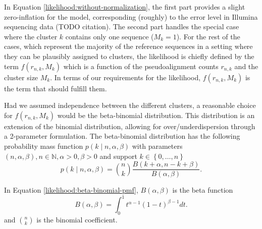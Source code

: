 \documentclass[officiallayout]{tktla}
\begin{document}
In Equation \ref{likelihood:without-normalization}, the first part provides a slight
zero-inflation for the model, corresponding (roughly) to the error
level in Illumina sequencing data (TODO citation). The second part
handles the special case where the cluster $k$ contains only one
sequence ($M_{k} = 1$). For the rest of the cases, which represent the
majority of the reference sequences in a setting where they can be
plausibly assigned to clusters, the likelihood is chiefly defined by
the term $f\left(r_{n, k}, M_{k}\right)$ which is a function of the
pseudoalignment counts $r_{n, k}$ and the cluster size $M_{k}$. In
terms of our requirements for the likelihood, $f\left(r_{n, k},
M_{k}\right)$ is the term that should fulfill them.

Had we assumed independence between the different clusters, a
reasonable choice for $f\left(r_{n, k}, M_{k}\right)$ would be the
beta-binomial distribution. This distribution is an extension of the
binomial distribution, allowing for over/underdispersion through a
2-parameter formulation. The beta-binomial distribution has the
following probability mass function $p\left(k \middle | n, \alpha,
\beta\right)$ with parameters $\left(n, \alpha, \beta\right), n \in
\mathbb{N}, \alpha > 0, \beta > 0$ and support $k \in \left\{0, \dots,
n\right\}$
\begin{equation}
  \label{likelihood:beta-binomial-pmf}
  p\left(k \middle| n, \alpha, \beta\right) = \binom{n}{k}\frac{B\left(k + \alpha, n - k + \beta\right)}{B\left(\alpha, \beta\right)}.
\end{equation}

In Equation \ref{likelihood:beta-binomial-pmf}, $B\left(\alpha, \beta\right)$ is the beta function
\begin{equation}
  \label{likelihood:beta-function}
  B\left(\alpha, \beta\right) = \int_{0}^{1}t^{\alpha - 1}\left(1 - t\right)^{\beta - 1}dt.
\end{equation}
and $\binom{n}{k}$ is the binomial coefficient.
\end{document}
